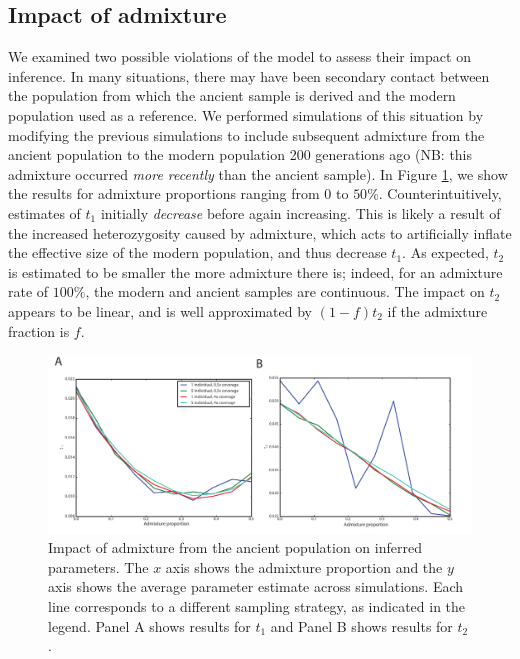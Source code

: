 \documentclass[11pt, oneside]{article}   	%
\begin{document}
\subsection{Impact of admixture}
We examined two possible violations of the model to assess their impact on inference. In many situations, there may have been secondary contact between the population from which the ancient sample is derived and the modern population used as a reference. We performed simulations of this situation by modifying the previous simulations to include subsequent admixture from the ancient population to the modern population 200 generations ago (NB: this admixture occurred \emph{more recently} than the ancient sample). In Figure \ref{admixture}, we show the results for admixture proportions ranging from $0$ to $50\%$. Counterintuitively, estimates of $t_1$ initially \emph{decrease} before again increasing. This is likely a result of the increased heterozygosity caused by admixture, which acts to artificially inflate the effective size of the modern population, and thus decrease $t_1$. As expected, $t_2$ is estimated to be smaller the more admixture there is; indeed, for an admixture rate of $100\%$, the modern and ancient samples are continuous. The impact on $t_2$ appears to be linear, and is well approximated by $(1-f)t_2$ if the admixture fraction is $f$. 

\begin{figure}[h] %
   \centering
   \includegraphics[width=\textwidth]{t1_t2_admixture.pdf} 
   \caption{Impact of admixture from the ancient population on inferred parameters. The $x$ axis shows the admixture proportion and the $y$ axis shows the average parameter estimate across simulations. Each line corresponds to a different sampling strategy, as indicated in the legend. Panel A shows results for $t_1$ and Panel B shows results for $t_2$.}
   \label{admixture}
\end{figure}
\end{document}
